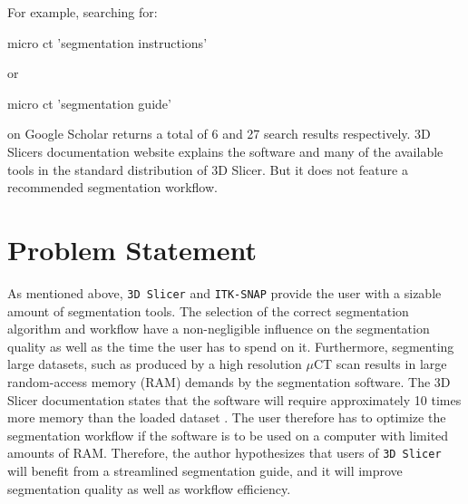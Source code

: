 \begin{body}
	For example, searching for:
	\begin{displayquote}
		micro ct 'segmentation instructions'
	\end{displayquote}
	or
	\begin{displayquote}
		micro ct 'segmentation guide'
	\end{displayquote}
	on Google Scholar returns a total of 6 and 27 search results respectively.
	3D Slicers documentation website\cite{pinterPolymorphSegmentationRepresentation2019} explains the software and many of the available tools in the standard distribution of 3D Slicer. But it does not feature a recommended segmentation workflow.
\end{body}
\clearpage
\section{Problem Statement}
\begin{body}
	As mentioned above, \texttt{3D Slicer} and \texttt{ITK-SNAP} provide the user with a sizable amount of segmentation tools. The selection of the correct segmentation algorithm and workflow have a non-negligible influence on the segmentation quality as well as the time the user has to spend on it\cite{liuSAMMSegmentAny2023}. Furthermore, segmenting large datasets, such as produced by a high resolution $\mu$CT scan results in large random-access memory (RAM) demands by the segmentation software\cite{smistadMedicalImageSegmentation2015}.
	The 3D Slicer documentation states that the software will require approximately 10 times more memory than the loaded dataset \cite{slicercommunity3DSlicerImage2022,fedorov3DSlicerImage2012}.
	The user therefore has to optimize the segmentation workflow if the software is to be used on a computer with limited amounts of RAM.
	Therefore, the author hypothesizes that users of \texttt{3D Slicer} will benefit from a streamlined segmentation guide, and it will improve segmentation quality as well as workflow efficiency.
\end{body}
\clearpage
